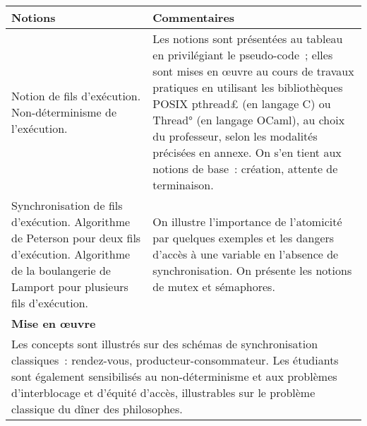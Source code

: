 \noindent
\begin{longtable}{|p{\lnotion}|p{\comment}|}
  \hline
  \textbf{Notions} & \textbf{Commentaires}\\
  \hline \hline
  Notion de fils d'exécution. Non-déterminisme de l'exécution. 
  &
  Les notions sont présentées au tableau en privilégiant le pseudo-code~; elles sont mises en \oe uvre au cours de travaux pratiques en utilisant les bibliothèques POSIX
   \£pthread£ (en langage C) ou \°Thread° (en langage OCaml), au choix du professeur, selon les modalités précisées en annexe. On s'en tient aux notions de base~: création, attente de
    terminaison.
  \\
  \hline
  Synchronisation de fils d'exécution. Algorithme de Peterson pour deux fils d'exécution. Algorithme de la boulangerie de Lamport pour plusieurs fils d'exécution.
  &
  On illustre l'importance de l'atomicité par quelques exemples et les dangers d’accès à une variable en l’absence de synchronisation. On présente les notions de mutex et sémaphores.
  \\
  \hline \hline
  \multicolumn{2}{|p{\lmoe}|}{\textbf{Mise en \oe uvre}} \\
  \hline
  \multicolumn{2}{|p{\lmoe}|}{
  Les concepts sont illustrés sur des schémas de synchronisation classiques~:
  rendez-vous, producteur-consommateur. Les étudiants sont également
  sensibilisés au non-déterminisme et aux problèmes d'interblocage et d'équité
  d'accès, illustrables sur le problème classique du dîner des philosophes.
  } \\
  \hline
\end{longtable}











